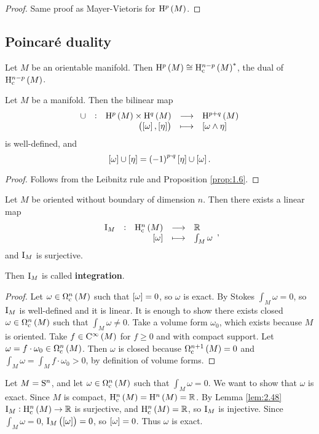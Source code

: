 \begin{proof}
Same proof as Mayer-Vietoris for $ \H^p\br{M} $.
\end{proof}

\subsection{Poincar\'e duality}

Let $ M $ be an orientable manifold. Then $ \H^p\br{M} \cong \H_\c^{n - p}\br{M}^* $, the dual of $ \H_\c^{n - p}\br{M} $.

\begin{proposition}
Let $ M $ be a manifold. Then the bilinear map
$$ \function[\cup]{\H^p\br{M} \times \H^q\br{M}}{\H^{p + q}\br{M}}{\br{\sbr{\omega}, \sbr{\eta}}}{\sbr{\omega \wedge \eta}} $$
is well-defined, and
$$ \sbr{\omega} \cup \sbr{\eta} = \br{-1}^{p \cdot q}\sbr{\eta} \cup \sbr{\omega}. $$
\end{proposition}

\begin{proof}
Follows from the Leibnitz rule and Proposition \ref{prop:1.6}.
\end{proof}

\pagebreak

\begin{lemma}
\label{lem:2.48}
Let $ M $ be oriented without boundary of dimension $ n $. Then there exists a linear map
$$ \function[\I_M]{\H_\c^n\br{M}}{\RR}{\sbr{\omega}}{\int_M \omega}, $$
and $ \I_M $ is surjective.
\end{lemma}

Then $ \I_M $ is called \textbf{integration}.

\begin{proof}
Let $ \omega \in \Omega_\c^n\br{M} $ such that $ \sbr{\omega} = 0 $, so $ \omega $ is exact. By Stokes $ \int_M \omega = 0 $, so $ \I_M $ is well-defined and it is linear. It is enough to show there exists closed $ \omega \in \Omega_\c^n\br{M} $ such that $ \int_M \omega \ne 0 $. Take a volume form $ \omega_0 $, which exists because $ M $ is oriented. Take $ f \in \C^\infty\br{M} $ for $ f \ge 0 $ and with compact support. Let $ \omega = f \cdot \omega_0 \in \Omega_\c^n\br{M} $. Then $ \omega $ is closed because $ \Omega_\c^{n + 1}\br{M} = 0 $ and $ \int_M \omega = \int_M f \cdot \omega_0 > 0 $, by definition of volume forms.
\end{proof}

\begin{example}
Let $ M = \S^n $, and let $ \omega \in \Omega_\c^n\br{M} $ such that $ \int_M \omega = 0 $. We want to show that $ \omega $ is exact. Since $ M $ is compact, $ \H_\c^n\br{M} = \H^n\br{M} = \RR $. By Lemma \ref{lem:2.48} $ \I_M : \H_\c^n\br{M} \to \RR $ is surjective, and $ \H_\c^n\br{M} = \RR $, so $ \I_M $ is injective. Since $ \int_M \omega = 0 $, $ \I_M\br{\sbr{\omega}} = 0 $, so $ \sbr{\omega} = 0 $. Thus $ \omega $ is exact.
\end{example}

